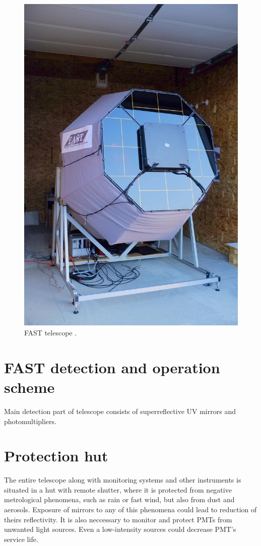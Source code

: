 \begin{figure}[H]
 \centering
 \includegraphics[scale = 0.2]{./pictures/FASTReal}
 \caption{FAST telescope \cite{Project}.}
 \label{FASThut}
 
\end{figure}
\section{FAST detection and operation scheme}
Main detection part of telescope consists of superreflective UV mirrors and photomultipliers. 


\par

\section{Protection hut}
The entire telescope along with monitoring systems and other instruments is situated in a hut with remote shutter, where it is protected from negative metrological phenomena, such as rain or fast wind, but also from dust and aerosols. Exposure of mirrors to any of this phenomena could lead to reduction of theirs reflectivity. It is also neccessary to monitor and protect PMTs from unwanted light sources. Even a low-intensity sources could decrease PMT's service life.

